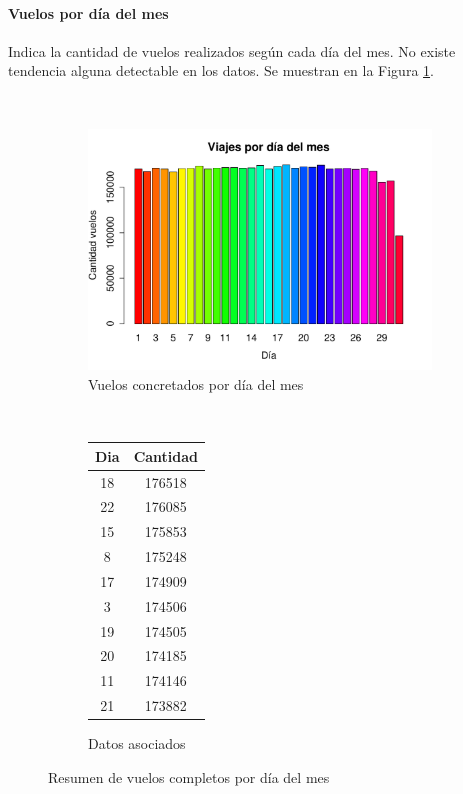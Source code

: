 \documentclass[12pt]{article}
\numberwithin{equation}{section}
\numberwithin{table}{section}
\numberwithin{figure}{section}
\begin{document}
\paragraph{Vuelos por día del mes}
Indica la cantidad de vuelos realizados según cada día del mes.
No existe tendencia alguna detectable en los datos.
Se muestran en la Figura \ref{fig:concretados-por-dia-mes}.

\begin{figure}
        \centering
        ~
        \begin{subfigure}[b]{0.6\textwidth}
                \includegraphics[width=1\columnwidth]{imagenes/completos/viajes-por-dia-mes}
                \caption{Vuelos concretados por día del mes}
        \end{subfigure}
        ~
        \begin{subfigure}[b]{0.3\textwidth}
\begin{tabular}{@{}cc@{}}
\toprule
\textbf{Dia} & \textbf{Cantidad} \\ \midrule
18           & 176518            \\
22           & 176085            \\
15           & 175853            \\
8            & 175248            \\
17           & 174909            \\
3            & 174506            \\
19           & 174505            \\
20           & 174185            \\
11           & 174146            \\
21           & 173882            \\ \bottomrule
\end{tabular}    
\caption{Datos asociados}
        \end{subfigure}
        \caption{Resumen de vuelos completos por día del mes}
        \label{fig:concretados-por-dia-mes}
\end{figure}
\end{document}
